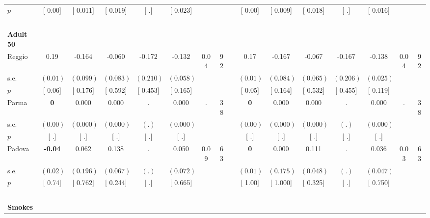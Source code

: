 \begin{longtable}{L{8em} c c c c c c c p{1em} c c c c c c c}
\quad \quad \quad \quad $ p$ & [     0.00] & [    0.011] & [    0.019] & [        .] & [    0.023] & & & & [     0.00] & [    0.009] & [    0.018] & [        .] & [    0.016] & &  \\[1em]
~\\[1em]
\quad \quad \textbf{Adult 50} & & & & & & & & & & & & & & & \\* 
\quad \quad \quad Reggio& 0.19 &    -0.164 &    -0.060 &    -0.172 &    -0.132 &      0.04 &        92 & & 0.17 &    -0.167 &    -0.067 &    -0.167 &    -0.138 &      0.04 &        92  \\*
\quad \quad \quad \quad s.e.& $ (     0.01)$ & $ (    0.099)$ & $ (    0.083)$ & $ (    0.210)$ & $ (    0.058)$ & & & & $ (     0.01)$ & $ (    0.084)$ & $ (    0.065)$ & $ (    0.206)$ & $ (    0.025)$ & &  \\*
\quad \quad \quad \quad $ p$ & [     0.06] & [    0.176] & [    0.592] & [    0.453] & [    0.165] & & & & [     0.05] & [    0.164] & [    0.532] & [    0.455] & [    0.119] & &  \\[1em]
\quad \quad \quad Parma& \textbf{0} &     0.000 &     0.000 &         . &     0.000 &         . &        38 & & \textbf{0} &     0.000 &     0.000 &         . &     0.000 &         . &        38  \\*
\quad \quad \quad \quad s.e.& $ (     0.00)$ & $ (    0.000)$ & $ (    0.000)$ & $ (        .)$ & $ (    0.000)$ & & & & $ (     0.00)$ & $ (    0.000)$ & $ (    0.000)$ & $ (        .)$ & $ (    0.000)$ & &  \\*
\quad \quad \quad \quad $ p$ & [        .] & [        .] & [        .] & [        .] & [        .] & & & & [        .] & [        .] & [        .] & [        .] & [        .] & &  \\[1em]
\quad \quad \quad Padova& \textbf{    -0.04} &     0.062 &     0.138 &         . &     0.050 &      0.09 &        63 & & \textbf{0} &     0.000 &     0.111 &         . &     0.036 &      0.03 &        63  \\*
\quad \quad \quad \quad s.e.& $ (     0.02)$ & $ (    0.196)$ & $ (    0.067)$ & $ (        .)$ & $ (    0.072)$ & & & & $ (     0.01)$ & $ (    0.175)$ & $ (    0.048)$ & $ (        .)$ & $ (    0.047)$ & &  \\*
\quad \quad \quad \quad $ p$ & [     0.74] & [    0.762] & [    0.244] & [        .] & [    0.665] & & & & [     1.00] & [    1.000] & [    0.325] & [        .] & [    0.750] & &  \\[1em]
~\\[1em]
\textbf{Smokes} \\*

\end{longtable}
